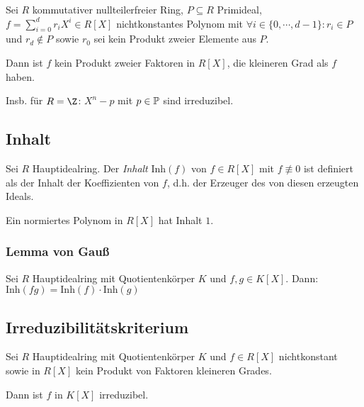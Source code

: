 Sei $R$ kommutativer nullteilerfreier Ring, $P \subseteq R$ Primideal, $f = \sum_{i=0}^d r_i X^i \in R[X]$ nichtkonstantes Polynom mit $\forall i \in \{0,\cdots,d-1\} : r_i \in P$ und $r_d \notin P$ sowie $r_0$ sei kein Produkt zweier Elemente aus $P$.

\vspace*{1mm}

Dann ist $f$ kein Produkt zweier Faktoren in $R[X]$, die kleineren Grad als $f$ haben.

\vspace*{1mm}

Insb. für $R = \Z$: $X^n - p$ mit $p \in \mathbb{P}$ sind irreduzibel.

\subsection*{Inhalt}

Sei $R$ Hauptidealring. Der \emph{Inhalt} $\text{Inh}(f)$ von $f \in R[X]$ mit $f \not\equiv 0$ ist definiert als der Inhalt der Koeffizienten von $f$, d.h. der Erzeuger des von diesen erzeugten Ideals.

\vspace*{1mm}

Ein normiertes Polynom in $R[X]$ hat Inhalt $1$.

\subsubsection*{Lemma von Gauß}

Sei $R$ Hauptidealring mit Quotientenkörper $K$ und $f, g \in K[X]$. Dann: $\text{Inh}(fg) = \text{Inh}(f)\cdot\text{Inh}(g)$

\subsection*{Irreduzibilitätskriterium}

Sei $R$ Hauptidealring mit Quotientenkörper $K$ und $f \in R[X]$ nichtkonstant sowie in $R[X]$ kein Produkt von Faktoren kleineren Grades.

Dann ist $f$ in $K[X]$ irreduzibel.
